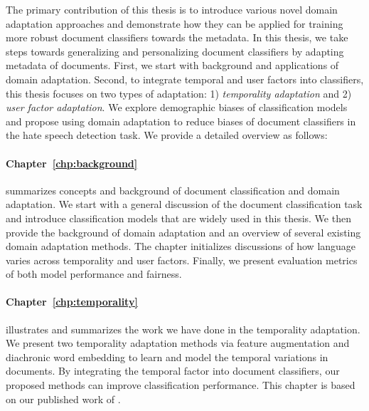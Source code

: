 
The primary contribution of this thesis is to introduce various novel domain adaptation approaches and demonstrate how they can be applied for training more robust document classifiers towards the metadata.
In this thesis, we take steps towards generalizing and personalizing document classifiers by adapting metadata of documents.
First, we start with background and applications of domain adaptation.
Second, to integrate temporal and user factors into classifiers, this thesis focuses on two types of adaptation: 1) \textit{temporality adaptation} and 2) \textit{user factor adaptation}.
We explore demographic biases of classification models and propose using domain adaptation to reduce biases of document classifiers in the hate speech detection task.
We provide a detailed overview as follows:

\paragraph{Chapter~\ref{chp:background}} summarizes concepts and background of document classification and domain adaptation. We start with a general discussion of the document classification task and introduce classification models that are widely used in this thesis. We then provide the background of domain adaptation and an overview of several existing domain adaptation methods. The chapter initializes discussions of how language varies across temporality and user factors. Finally, we present evaluation metrics of both model performance and fairness.

\paragraph{Chapter~\ref{chp:temporality}} illustrates and summarizes the work we have done in the temporality adaptation. We present two temporality adaptation methods via feature augmentation and diachronic word embedding to learn and model the temporal variations in documents. By integrating the temporal factor into document classifiers, our proposed methods can improve classification performance. This chapter is based on our published work of \cite{huang2018examining, huang2019neural}.

